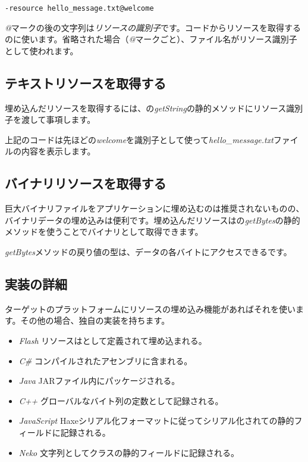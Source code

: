 \begin{lstlisting}
-resource hello_message.txt@welcome
\end{lstlisting}

\emph{@}マークの後の文字列は\emph{リソースの識別子}です。コードからリソースを取得するのに使います。省略された場合（\emph{@}マークごと）、ファイル名がリソース識別子として使われます。

\subsection{テキストリソースを取得する}
\label{cr-resources-getString}

埋め込んだリソースを取得するには、の\emph{getString}の静的メソッドにリソース識別子を渡して事項します。


上記のコードは先ほどの\emph{welcome}を識別子として使って\emph{hello_message.txt}ファイルの内容を表示します。

\subsection{バイナリリソースを取得する}
\label{cr-resources-getBytes}

巨大バイナリファイルをアプリケーションに埋め込むのは推奨されないものの、バイナリデータの埋め込みは便利です。埋め込んだリソースはの\emph{getBytes}の静的メソッドを使うことでバイナリとして取得できます。


\emph{getBytes}メソッドの戻り値の型は、データの各バイトにアクセスできるです。

\subsection{実装の詳細}
\label{cr-resources-impl}

ターゲットのプラットフォームにリソースの埋め込み機能があればそれを使います。その他の場合、独自の実装を持ちます。

\begin{itemize}
\item \emph{Flash} リソースはとして定義されて埋め込まれる。
\item \emph{C\#} コンパイルされたアセンブリに含まれる。
\item \emph{Java} JARファイル内にパッケージされる。
\item \emph{C++} グローバルなバイト列の定数として記録される。
\item \emph{JavaScript} Haxeシリアル化フォーマットに従ってシリアル化されての静的フィールドに記録される。
\item \emph{Neko} 文字列としてクラスの静的フィールドに記録される。
\end{itemize}


